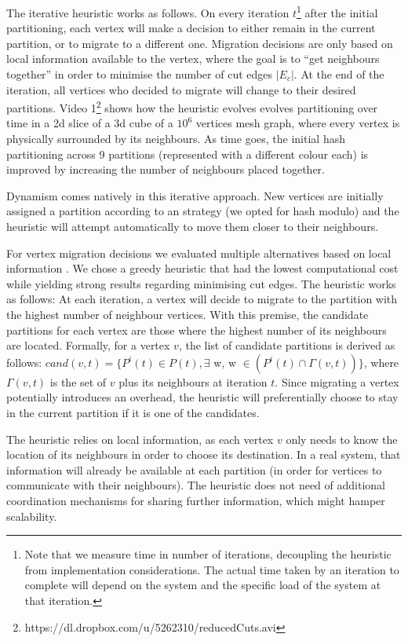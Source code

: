 \documentclass{sig-alternate-10pt}
\begin{document}
The iterative heuristic works as follows.  On every iteration $t$\footnote{Note that we measure time in number of iterations, decoupling the heuristic from implementation considerations. The actual time taken by an iteration to complete will depend on the system and the specific load of the system at that iteration.} after the initial partitioning, each vertex will make a decision to either remain in the current partition, or to migrate to a different one. Migration decisions are only based on local information available to the vertex, where the goal is to ``get neighbours together'' in order to minimise the number of cut edges $|E_c|$. At the end of the iteration, all vertices who decided to migrate will change to their desired partitions. Video 1\footnote{https://dl.dropbox.com/u/5262310/reducedCuts.avi} shows how the heuristic evolves evolves partitioning over time in a 2d slice of a 3d cube of a $10^6$ vertices mesh graph, where every vertex is physically surrounded by its neighbours. As time goes, the initial hash partitioning across 9 partitions (represented with a different colour each) is improved by increasing the number of neighbours placed together.  


Dynamism comes natively in this iterative approach. New vertices are initially assigned a partition according to an strategy (we opted for hash modulo) and the heuristic will attempt automatically to move them closer to their neighbours. 

For vertex migration decisions we evaluated multiple alternatives based on local information \cite{Stanton2012,Prabha12}. We chose a greedy heuristic that had the lowest computational cost while yielding strong results regarding minimising cut edges. The heuristic works as follows: At each iteration, a vertex will decide to migrate to the partition with the highest number of neighbour vertices. With this premise, the candidate partitions for each vertex are those where the highest number of its neighbours are located. Formally, for a vertex $v$, the list of candidate partitions is derived as follows: $cand(v,t) = \{ P^{i}(t)\in P(t), \exists$ w, w $\in (P^{i}(t) \cap \Gamma(v,t)  ) \}$, where $\Gamma(v,t)$ is the set of $v$ plus its neighbours at iteration $t$. Since migrating a vertex potentially introduces an overhead, the heuristic will preferentially choose to stay in the current partition if it is one of the candidates.

The heuristic relies on local information, as each vertex $v$ only needs to know the location of its neighbours in order to choose its destination. In a real system, that information will already be available at each partition (in order for vertices to communicate with their neighbours). The heuristic does not need of additional coordination mechanisms for sharing further information, which might hamper scalability.
\end{document}
